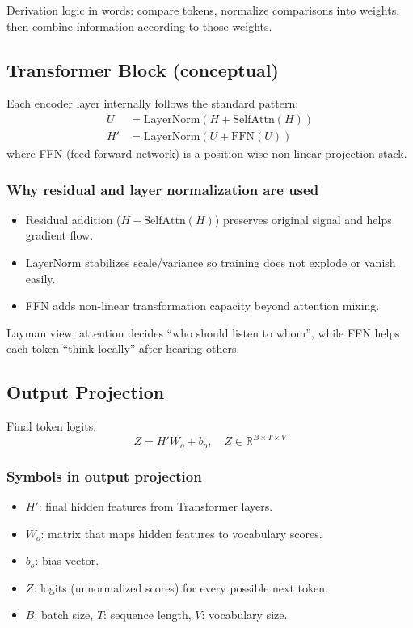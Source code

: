 \documentclass[a4paper,11pt]{article}
\begin{document}
Derivation logic in words: compare tokens, normalize comparisons into weights, then combine information according to those weights.

\subsection{Transformer Block (conceptual)}
Each encoder layer internally follows the standard pattern:
\begin{align*}
U &= \text{LayerNorm}(H + \text{SelfAttn}(H)) \\
H' &= \text{LayerNorm}(U + \text{FFN}(U))
\end{align*}
where FFN (feed-forward network) is a position-wise non-linear projection stack.

\subsubsection{Why residual and layer normalization are used}
\begin{itemize}[leftmargin=1.5em]
    \item Residual addition ($H + \text{SelfAttn}(H)$) preserves original signal and helps gradient flow.
    \item LayerNorm stabilizes scale/variance so training does not explode or vanish easily.
    \item FFN adds non-linear transformation capacity beyond attention mixing.
\end{itemize}

Layman view: attention decides ``who should listen to whom'', while FFN helps each token ``think locally'' after hearing others.

\subsection{Output Projection}
Final token logits:
\[
Z = H'W_o + b_o, \quad Z \in \mathbb{R}^{B \times T \times V}
\]

\subsubsection{Symbols in output projection}
\begin{itemize}[leftmargin=1.5em]
    \item $H'$: final hidden features from Transformer layers.
    \item $W_o$: matrix that maps hidden features to vocabulary scores.
    \item $b_o$: bias vector.
    \item $Z$: logits (unnormalized scores) for every possible next token.
    \item $B$: batch size, $T$: sequence length, $V$: vocabulary size.
\end{itemize}
\end{document}
